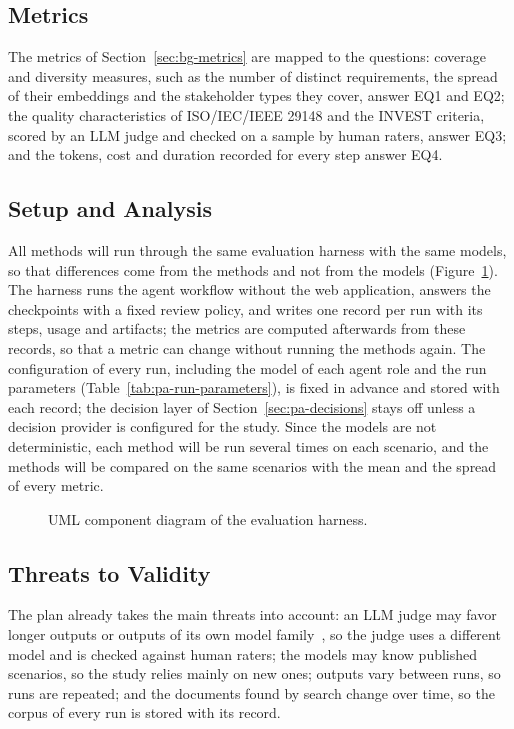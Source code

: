 \subsection{Metrics}
\label{sec:eval-metrics}
The metrics of Section~\ref{sec:bg-metrics} are mapped to the questions: coverage and diversity measures, such as the number of distinct requirements, the spread of their embeddings and the stakeholder types they cover, answer EQ1 and EQ2; the quality characteristics of ISO/IEC/IEEE 29148 and the INVEST criteria, scored by an LLM judge and checked on a sample by human raters, answer EQ3; and the tokens, cost and duration recorded for every step answer EQ4.

\subsection{Setup and Analysis}
\label{sec:eval-details}
All methods will run through the same evaluation harness with the same models, so that differences come from the methods and not from the models (Figure~\ref{fig:eval-harness}). The harness runs the agent workflow without the web application, answers the checkpoints with a fixed review policy, and writes one record per run with its steps, usage and artifacts; the metrics are computed afterwards from these records, so that a metric can change without running the methods again. The configuration of every run, including the model of each agent role and the run parameters (Table~\ref{tab:pa-run-parameters}), is fixed in advance and stored with each record; the decision layer of Section~\ref{sec:pa-decisions} stays off unless a decision provider is configured for the study. Since the models are not deterministic, each method will be run several times on each scenario, and the methods will be compared on the same scenarios with the mean and the spread of every metric.

\begin{figure}[H]
    \centering
    \resizebox{\linewidth}{!}{}
    \caption{UML component diagram of the evaluation harness.}
    \label{fig:eval-harness}
\end{figure}

\subsection{Threats to Validity}
\label{sec:eval-discussion}
The plan already takes the main threats into account: an LLM judge may favor longer outputs or outputs of its own model family~\cite{zheng2023judging}, so the judge uses a different model and is checked against human raters; the models may know published scenarios, so the study relies mainly on new ones; outputs vary between runs, so runs are repeated; and the documents found by search change over time, so the corpus of every run is stored with its record.

